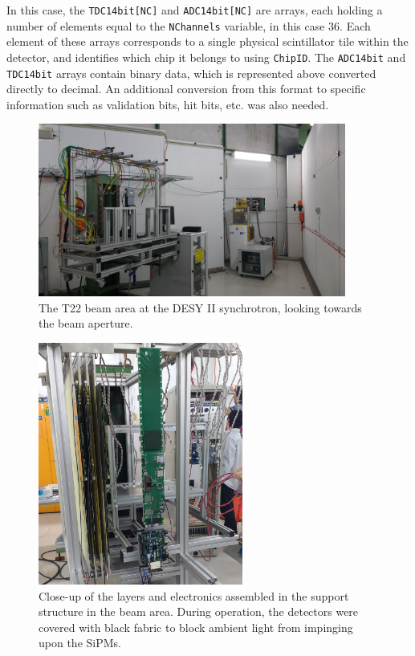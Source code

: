 In this case, the \texttt{TDC14bit[NC]} and \texttt{ADC14bit[NC]} are arrays, each holding a number of elements equal to the \texttt{NChannels} variable, in this case 36. Each element of these arrays corresponds to a single physical scintillator tile within the detector, and identifies which chip it belongs to using \texttt{ChipID}. The \texttt{ADC14bit} and \texttt{TDC14bit} arrays contain binary data, which is represented above converted directly to decimal. An additional conversion from this format to specific information such as validation bits, hit bits, etc. was also needed.


\begin{figure}[p]
	\centering
	\includegraphics[width=0.9\textwidth]{../Pictures/AHCAL-DESY-2016-Beam.jpg}
	\caption{The T22 beam area at the DESY II synchrotron, looking towards the beam aperture.}
	\label{figure:aida/may2016/beamarea}
\end{figure}

\begin{figure}[p]
	\centering
	\includegraphics[width=0.6\textwidth]{../Pictures/AHCAL-DESY-2016-Assembled-2.jpg}
	\caption{Close-up of the layers and electronics assembled in the support structure in the beam area. During operation, the detectors were covered with black fabric to block ambient light from impinging upon the \acrshort{SiPM}s.}
	\label{figure:aida/may2016/assembled}
\end{figure}

